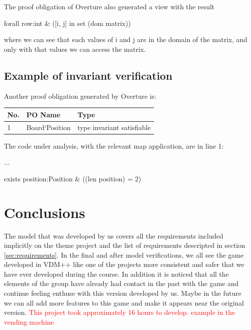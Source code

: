 \documentclass[a4paper]{article}
\begin{document}
The proof obligation of Overture also generated a view with the result 
\begin{center}
	forall row:int \& ([i, j] in set (dom matrix))
\end{center}
where we can see that each values of i and j are in the domain of the matrix, and only with that values we can access the matrix.
 


\subsection{Example of invariant verification} 

Another proof obligation generated by Overture is:

\begin{table}[!h]
	\centering
	\label{invariant-verification}
	\begin{tabular}{|l|l|p{8.5cm}|}
		\hline
		No.  & PO Name & Type	\\	\hline
		1    & Board`Position & type invariant satisfiable	\\	\hline
	\end{tabular}
\end{table}

The code under analysis, with the relevant map application, are in line 1:



...

\begin{center}
	exists position:Position \& ((len position) = 2)
\end{center}

\section{Conclusions} 

The model that was developed by us covers all the requirements included implicitly on the theme project and the list of requirements descripted in section \ref{sec:requirements}.
In the final and after model verifications, we all see the game developed in VDM++ like one of the projects more consistent and safer that we have ever developed during the course. 
In addition it is noticed that all the elements of the group have already had contact in the past with the game and continue feeling enthuse with this version developed by us. Maybe in the future we can all add more features to this game and make it appears near the original version.
\textcolor{red}{This project took approximately 16 hours to develop. example in the vending machine}
\end{document}
